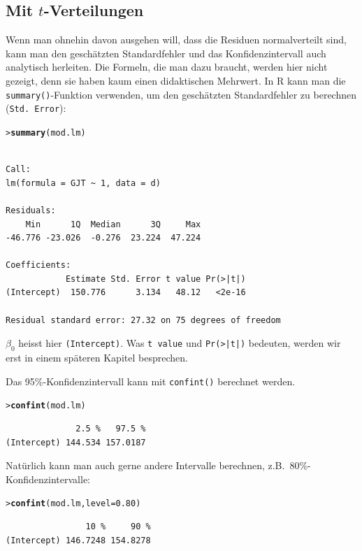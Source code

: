 \documentclass[oneside, 10pt]{book}\usepackage[]{graphicx}\usepackage[]{xcolor}
\makeatletter
\newcommand{\hlnum}[1]{\textcolor[rgb]{0.686,0.059,0.569}{#1}}%
\newcommand{\hlstd}[1]{\textcolor[rgb]{0.345,0.345,0.345}{#1}}%
\newcommand{\hlkwc}[1]{\textcolor[rgb]{0.333,0.667,0.333}{#1}}%
\newcommand{\hlkwd}[1]{\textcolor[rgb]{0.737,0.353,0.396}{\textbf{#1}}}%
\newenvironment{kframe}{%
 \def\at@end@of@kframe{}%
 \ifinner\ifhmode%
  \def\at@end@of@kframe{\end{minipage}}%
  \begin{minipage}{\columnwidth}%
 \fi\fi%
 \def\FrameCommand##1{\hskip\@totalleftmargin \hskip-\fboxsep
 \colorbox{shadecolor}{##1}\hskip-\fboxsep
     \hskip-\linewidth \hskip-\@totalleftmargin \hskip\columnwidth}%
 \MakeFramed {\advance\hsize-\width
   \@totalleftmargin\z@ \linewidth\hsize
   \@setminipage}}%
 {\par\unskip\endMakeFramed%
 \at@end@of@kframe}
\newenvironment{knitrout}{}{} %
\makeatother
\begin{document}
\subsection{Mit $t$-Verteilungen}
Wenn man ohnehin davon ausgehen will, dass die Residuen
normalverteilt sind, kann man den geschätzten
Standardfehler und das Konfidenzintervall
auch analytisch herleiten.
Die Formeln, die man dazu braucht, werden hier
nicht gezeigt, denn sie haben kaum einen didaktischen
Mehrwert.
In R kann man die \texttt{summary()}-Funktion
verwenden, um den geschätzten Standardfehler zu berechnen
(\texttt{Std. Error}):
\begin{knitrout}
\color{fgcolor}\begin{kframe}
\begin{alltt}
\hlstd{> }\hlkwd{summary}\hlstd{(mod.lm)}
\end{alltt}
\begin{verbatim}

Call:
lm(formula = GJT ~ 1, data = d)

Residuals:
    Min      1Q  Median      3Q     Max 
-46.776 -23.026  -0.276  23.224  47.224 

Coefficients:
            Estimate Std. Error t value Pr(>|t|)
(Intercept)  150.776      3.134   48.12   <2e-16

Residual standard error: 27.32 on 75 degrees of freedom
\end{verbatim}
\end{kframe}
\end{knitrout}
$\beta_0$ heisst hier \texttt{(Intercept)}.
Was \texttt{t value} und \texttt{Pr(>|t|)} bedeuten,
werden wir erst in einem späteren Kapitel besprechen.

Das 95\%-Konfidenzintervall kann mit \texttt{confint()}
berechnet werden.
\begin{knitrout}
\color{fgcolor}\begin{kframe}
\begin{alltt}
\hlstd{> }\hlkwd{confint}\hlstd{(mod.lm)}
\end{alltt}
\begin{verbatim}
              2.5 %   97.5 %
(Intercept) 144.534 157.0187
\end{verbatim}
\end{kframe}
\end{knitrout}

Natürlich kann man auch gerne andere Intervalle berechnen,
z.B.\ 80\%-Konfidenzintervalle:
\begin{knitrout}
\color{fgcolor}\begin{kframe}
\begin{alltt}
\hlstd{> }\hlkwd{confint}\hlstd{(mod.lm,} \hlkwc{level} \hlstd{=} \hlnum{0.80}\hlstd{)}
\end{alltt}
\begin{verbatim}
                10 %     90 %
(Intercept) 146.7248 154.8278
\end{verbatim}
\end{kframe}
\end{knitrout}
\end{document}
